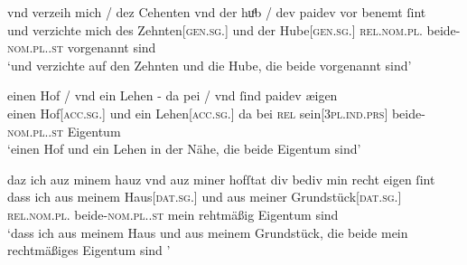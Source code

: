 \begin{exe}
\ex \label{ex:iclgr2}
\begin{xlist}
	\ex \label{ex:iclgr2_1}
		\gll vnd verzeih mich / \textelp{}  dez Cehenten vnd der huͦb 
				/ dev paidev {vor benemt} ſint \\
			und verzichte mich {} {} des Zehnten[\textsc{gen.sg.\MascI}] und der
				Hube[\textsc{gen.sg.\FemI}] {} \textsc{rel.nom.pl.\NeutI}
				beide-\textsc{nom.pl.\NeutI.st} vorgenannt sind \\
			\trans `und verzichte \textelp{} auf den Zehnten und die Hube,
				die beide vorgenannt sind'
				\parencites(Nr.~3261, Regensburg, 1299)[424,38--39]{cao4}

	\ex \label{ex:iclgr2_2}
		\gll einen Hof / vnd ein Lehen - da pei / vnd ſind paidev æigen \\
			einen Hof[\textsc{acc.sg.\MascI}] {} und ein
				Lehen[\textsc{acc.sg.\NeutI}] {} da bei {} \textsc{rel}
				sein[\textsc{3pl\subM.ind.prs}] beide-\textsc{nom.pl.\NeutI.st}
				Eigentum \\
			\trans `einen Hof und ein Lehen in der Nähe, die beide Eigentum
				sind'
				\parencites(Nr.~1923, Steyr, 1294)[194,36--37]{cao3}

	\ex \label{ex:iclgr2_3}
		\gll daz ich auz minem hauz vnd auz miner hofſtat div bediv min recht
				eigen ſint \textelp{} \\
			dass ich aus meinem Haus[\textsc{dat.sg.\NeutI}] und aus meiner
				Grundstück[\textsc{dat.sg.\FemI}] \textsc{rel.nom.pl.\NeutI}
				beide-\textsc{nom.pl.\NeutI.st} mein rehtmäßig Eigentum sind {}
				\\
			\trans `dass ich aus meinem Haus und aus meinem Grundstück, die
				beide mein rechtmäßiges Eigentum sind \textelp{}'
				\parencites(Nr.~1282, Ulm und Kl.~Raitenhaslach, Kr.~Altötting, 1282)[526,37--38]{cao2}
	\end{xlist}
\end{exe}


